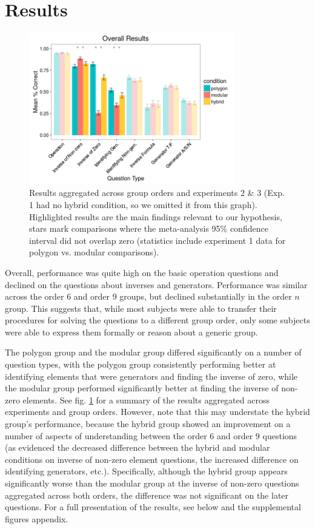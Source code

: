 \documentclass[man,10pt]{apa6}
\begin{document}
\section{Results}
\begin{figure}
\centering
\includegraphics[width=0.8\textwidth]{figures/overall_results.png}
\caption{Results aggregated across group orders and experiments 2 \& 3 (Exp. 1 had no hybrid condition, so we omitted it from this graph). Highlighted results are the main findings relevant to our hypothesis, stars mark comparisons where the meta-analysis 95\% confidence interval did not overlap zero (statistics include experiment 1 data for polygon vs. modular comparisons).}
\label{overall_results}
\end{figure}
Overall, performance was quite high on the basic operation questions and declined on the questions about inverses and generators. Performance was similar across the order 6 and order 9 groups, but declined substantially in the order $n$ group. This suggests that, while most subjects were able to transfer their procedures for solving the questions to a different group order, only some subjects were able to express them formally or reason about a generic group. \par
The polygon group and the modular group differed significantly on a number of question types, with the polygon group consistently performing better at identifying elements that were generators and finding the inverse of zero, while the modular group performed significantly better at finding the inverse of non-zero elements. See fig. \ref{overall_results} for a summary of the results aggregated across experiments and group orders. However, note that this may understate the hybrid group's performance, because the hybrid group showed an improvement on a number of aspects of understanding between the order 6 and order 9 questions (as evidenced the decreased difference between the hybrid and modular conditions on inverse of non-zero element questions, the increased difference on identifying generators, etc.). Specifically, although the hybrid group appears significantly worse than the modular group at the inverse of non-zero questions aggregated across both orders, the difference was not significant on the later questions. For a full presentation of the results, see below and the supplemental figures appendix.  
\FloatBarrier
\end{document}
